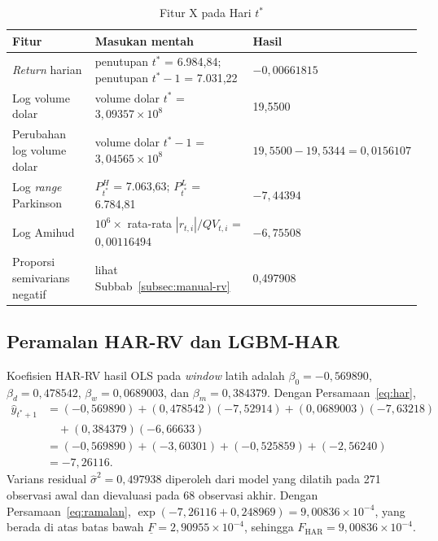\begin{table}[htbp]
  \caption{Fitur X pada Hari $t^*$}
  \label{tab:manual-x}
  \centering
  \begingroup
  \small
  \begin{tabular}{|p{}|p{}|p{}|}
    \hline
    \textbf{Fitur} & \textbf{Masukan mentah} & \textbf{Hasil} \\
    \hline
    \textit{Return} harian & penutupan $t^*$ = 6.984,84; penutupan $t^*-1$ =
      7.031,22 & $-0{,}00661815$ \\
    \hline
    Log volume dolar & volume dolar $t^*$ = $3{,}09357 \times 10^{8}$ &
      19,5500 \\
    \hline
    Perubahan log volume dolar & volume dolar $t^*-1$ =
      $3{,}04565 \times 10^{8}$ & $19{,}5500 - 19{,}5344 = 0{,}0156107$ \\
    \hline
    Log \textit{range} Parkinson & $P^H_{t^*}$ = 7.063,63;
      $P^L_{t^*}$ = 6.784,81 & $-7{,}44394$ \\
    \hline
    Log Amihud & $10^6 \times$ rata-rata $|r_{t,i}|/QV_{t,i}$ =
      $0{,}00116494$ & $-6{,}75508$ \\
    \hline
    Proporsi semivarians negatif & lihat Subbab~\ref{subsec:manual-rv} & 0,497908 \\
    \hline
  \end{tabular}
  \endgroup
\end{table}

\subsection{Peramalan HAR-RV dan LGBM-HAR}
Koefisien HAR-RV hasil OLS pada \textit{window} latih adalah
$\beta_0 = -0{,}569890$, $\beta_d = 0{,}478542$, $\beta_w = 0{,}0689003$, dan
$\beta_m = 0{,}384379$. Dengan Persamaan~\eqref{eq:har},
\begin{align}
  \hat y_{t^*+1} &= (-0{,}569890)
    + (0{,}478542)(-7{,}52914)
    + (0{,}0689003)(-7{,}63218) \nonumber \\
  &\quad + (0{,}384379)(-6{,}66633) \nonumber \\
  &= (-0{,}569890) + (-3{,}60301) + (-0{,}525859) + (-2{,}56240) \nonumber \\
  &= -7{,}26116 .
  \label{eq:manual-har}
\end{align}
Varians residual $\hat\sigma^2 = 0{,}497938$ diperoleh dari model yang dilatih
pada 271 observasi awal dan dievaluasi pada 68 observasi akhir. Dengan
Persamaan~\eqref{eq:ramalan},
$\exp(-7{,}26116 + 0{,}248969) = 9{,}00836 \times 10^{-4}$, yang berada di
atas batas bawah $\underline{F} = 2{,}90955 \times 10^{-4}$, sehingga
$F_{\text{HAR}} = 9{,}00836 \times 10^{-4}$.

